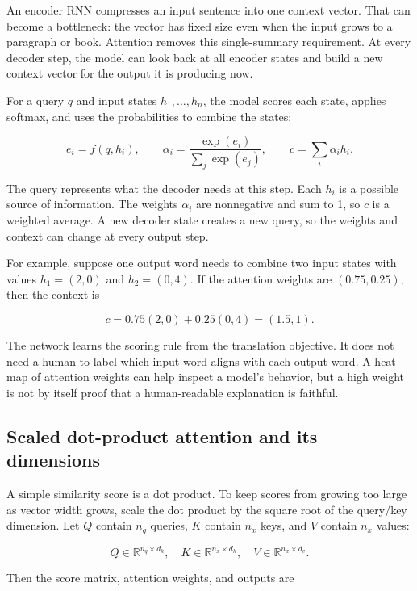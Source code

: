 An encoder RNN compresses an input sentence into one context vector. That can become a bottleneck: the vector has fixed size even when the input grows to a paragraph or book. Attention removes this single-summary requirement. At every decoder step, the model can look back at all encoder states and build a new context vector for the output it is producing now.

For a query \(q\) and input states \(h_1,\ldots,h_n\), the model scores each state, applies softmax, and uses the probabilities to combine the states:

\[
e_i=f(q,h_i),\qquad
\alpha_i=\frac{\exp(e_i)}{\sum_j\exp(e_j)},\qquad
c=\sum_i\alpha_i h_i.
\]

The query represents what the decoder needs at this step. Each \(h_i\) is a possible source of information. The weights \(\alpha_i\) are nonnegative and sum to 1, so \(c\) is a weighted average. A new decoder state creates a new query, so the weights and context can change at every output step.

For example, suppose one output word needs to combine two input states with values \(h_1=(2,0)\) and \(h_2=(0,4)\). If the attention weights are \((0.75,0.25)\), then the context is

\[
c=0.75(2,0)+0.25(0,4)=(1.5,1).
\]

The network learns the scoring rule from the translation objective. It does not need a human to label which input word aligns with each output word. A heat map of attention weights can help inspect a model's behavior, but a high weight is not by itself proof that a human-readable explanation is faithful.

\subsection{Scaled dot-product attention and its dimensions}\label{04-visual-computing-ii-ch031-scaled-dot-product-attention-and-its-dimensions}

A simple similarity score is a dot product. To keep scores from growing too large as vector width grows, scale the dot product by the square root of the query/key dimension. Let \(Q\) contain \(n_q\) queries, \(K\) contain \(n_x\) keys, and \(V\) contain \(n_x\) values:

\[
Q\in\mathbb{R}^{n_q\times d_k},\quad
K\in\mathbb{R}^{n_x\times d_k},\quad
V\in\mathbb{R}^{n_x\times d_v}.
\]

Then the score matrix, attention weights, and outputs are

